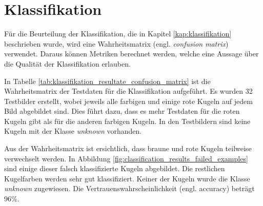 \section{Klassifikation}
Für die Beurteilung der Klassifikation, die in Kapitel \ref{kap:klassifikation} beschrieben wurde, wird eine
Wahrheitsmatrix\cite{wiki:confusion_matrix} (engl. \emph{confusion matrix}) verwendet.
Daraus können Metriken berechnet werden, welche eine Aussage über die Qualität der Klassifikation erlauben.

In Tabelle \ref{tab:klassifikation_resultate_confusion_matrix} ist die Wahrheitsmatrix der Testdaten
für die Klassifikation aufgeführt. Es wurden 32 Testbilder erstellt, wobei jeweils alle farbigen und einige rote Kugeln
auf jedem Bild abgebildet sind. Dies führt dazu, dass es mehr Testdaten für die roten Kugeln gibt als für die anderen farbigen Kugeln.
In den Testbildern sind keine Kugeln mit der Klasse \emph{unknown} vorhanden.

Aus der Wahrheitsmatrix ist ersichtlich, dass braune und rote Kugeln teilweise verwechselt werden.
In Abbildung \ref{fig:classification_results_failed_examples} sind einige dieser falsch klassifizierte Kugeln abgebildet.
Die restlichen Kugelfarben werden sehr gut klassifiziert. Keiner der Kugeln wurde die Klasse \emph{unknown} zugewiesen.
Die Vertrauenswahrscheinlichkeit\cite{wiki:beurteilung_binärer_klassifikator} (engl. accuracy) beträgt 96\%.

